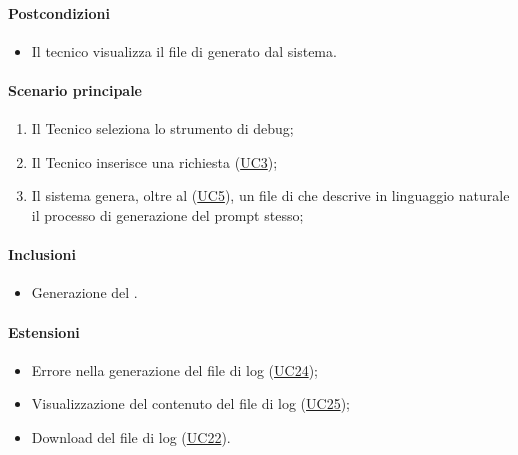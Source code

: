 \paragraph*{Postcondizioni}
\begin{itemize}
  \item Il tecnico visualizza il file di  generato dal sistema.
\end{itemize}

\paragraph*{Scenario principale}
\begin{enumerate}
  \item Il Tecnico seleziona lo strumento di debug;
  \item Il Tecnico inserisce una richiesta (\hyperref[UC3]{UC3});
  \item Il sistema genera, oltre al  (\hyperref[UC5]{UC5}), un file di  che descrive in linguaggio naturale il processo di generazione del prompt stesso; 
\end{enumerate}

\paragraph*{Inclusioni}
\begin{itemize}
  \item Generazione del .
\end{itemize}

\paragraph*{Estensioni}
\begin{itemize}
  \item Errore nella generazione del file di log (\hyperref[UC24]{UC24});
  \item Visualizzazione del contenuto del file di log (\hyperref[UC25]{UC25});
  \item Download del file di log (\hyperref[UC22]{UC22}).
\end{itemize}